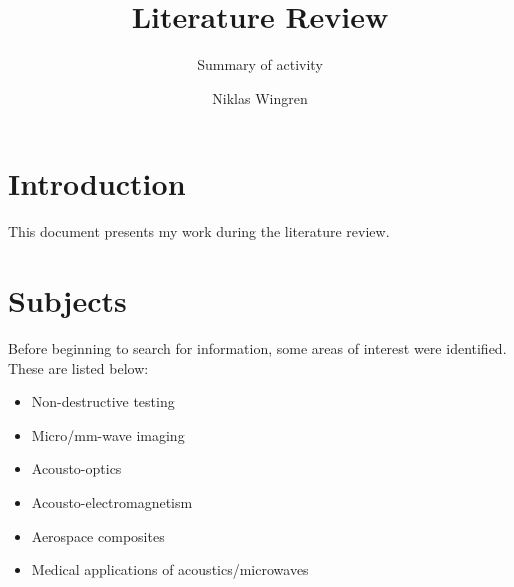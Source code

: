 \documentclass[10pt,a4paper,twocolumn,draft]{scrartcl}
\author{Niklas Wingren}
\title{Literature Review}
\subtitle{Summary of activity}
\begin{document}
	
	\maketitle
	
	\section{Introduction}
	This document presents my work during the literature review.
	
	\section{Subjects}
	Before beginning to search for information, some areas of interest were identified. These are listed below:
	
	\begin{itemize}
		\item Non-destructive testing
		\item Micro/mm-wave imaging
		\item Acousto-optics
		\item Acousto-electromagnetism
		\item Aerospace composites
		\item Medical applications of acoustics/microwaves
	\end{itemize}
	
	\begin{comment}
	\subsection{Acousto-electromagnetism}
	What is meant with the term "acousto-electromagnetism" is interaction between acoustics and electromagnetics in a more general sense than what is done in acousto-optics. The primary thought was that this would include phenomena which would occur at lower than optical frequencies (for example at mm-waves).
	
	Much work has been done at the University of Minnesota Radiation Lab when it comes to an electromagnetic view of the interaction \cite{Lawrence2001}\cite{Sarabandi2003}\cite{Buerkle2007}\cite{Buerkle2008}\cite{Buerkle2009}. The mechanism of interaction is based on both density variation and boundary perturbation of a target \cite{Buerkle2007}. The approach is very much based on radar since they consider electromagnetic detection of a discrete target, and acoustic waves are used to better illuminate said target. Analytic solutions exist for dielectric \cite{Lawrence2001} and metallic \cite{Sarabandi2003} infinite cylinders. There are also numeric simulations using the same approach, but for more complex targets \cite{Buerkle2008}\cite{Buerkle2009}.
	\end{comment}
	
\end{document}
